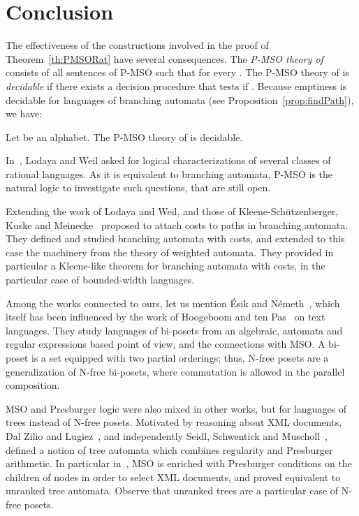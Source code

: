 \documentclass{CSML}
\begin{document}
\section{Conclusion}
\label{sec:conclusion}

The effectiveness of the constructions involved in the proof of Theorem~\ref{th:PMSORat} have several consequences.
The \emph{P-MSO theory  of } consists of all sentences  of P-MSO such that  for every . The P-MSO theory of  is \emph{decidable} if there exists a decision procedure that tests if .
Because emptiness is decidable for languages of branching automata (see Proposition~\ref{prop:findPath}), we have:
\begin{thm}
  \label{th:PMSODecidable}
  Let  be an alphabet.
  The P-MSO theory of  is decidable.
\end{thm}

In~\cite{LW00:sp}, Lodaya and Weil asked for logical characterizations of several classes of rational languages. 
As it is equivalent to branching automata, P-MSO is the natural logic to investigate such questions, that are still open.

Extending the work of Lodaya and Weil, and those of Kleene-Sch\"utzenberger, Kuske and Meinecke~\cite{Kuske200453} proposed to attach costs to paths in branching automata. They defined and studied branching automata with costs, and extended to this case the machinery from the theory of weighted automata. They provided in particular a Kleene-like theorem for branching automata with costs, in the particular case of bounded-width languages.

Among the works connected to ours, let us mention \'Esik and N{\'e}meth~\cite{EN01}, which itself has been influenced by the work of Hoogeboom and ten Pas~\cite{HtP:1996,HtP:1997} on text languages. They study languages of bi-posets from an algebraic, automata and regular expressions based point of view, and the connections with MSO. A bi-poset is a set equipped with two partial orderings; thus, N-free posets are a generalization of N-free bi-posets, where commutation is allowed in the parallel composition. 

MSO and Presburger logic were also mixed in other works, but for languages of trees instead of N-free posets. Motivated by reasoning about XML documents, Dal Zilio and Lugiez~\cite{DBLP:conf/rta/Dal-ZilioL03}, and independently Seidl, Schwentick and Muscholl~\cite{DBLP:conf/birthday/SeidlSM08}, defined a notion of tree automata which combines regularity and Presburger arithmetic. In particular in~\cite{DBLP:conf/birthday/SeidlSM08}, MSO is enriched with Presburger conditions on the children of nodes in order to select XML documents, and proved equivalent to unranked tree automata. Observe that unranked trees are a particular case of N-free posets.
\end{document}
